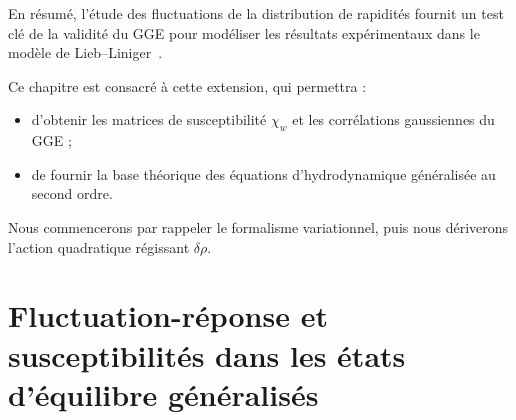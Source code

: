 \medskip
En résumé, l’étude des fluctuations de la distribution de rapidités fournit un test clé de la validité du GGE pour modéliser les résultats expérimentaux dans le modèle de Lieb–Liniger~\cite{DeNardis2017}.

\medskip
Ce chapitre est consacré à cette extension, qui permettra :
\begin{itemize}[label = $\bullet$]
  \item d’obtenir les matrices de susceptibilité \(\chi_{w}\)  et les corrélations gaussiennes du GGE ;
  \item de fournir la base théorique des équations d’hydrodynamique généralisée au second ordre.
\end{itemize}

Nous commencerons par rappeler le formalisme variationnel, puis nous dériverons l’action quadratique régissant \(\delta\rho\).  %


\section{Fluctuation-réponse et susceptibilités dans les états d’équilibre généralisés}

%
%
%
%


